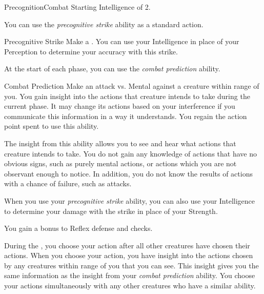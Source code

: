     \begin{feat}{Precognition}{Combat}
        \featpre Starting Intelligence of 2.

         You can use the \textit{precognitive strike} ability as a standard action.
        \begin{freeability}{Precognitive Strike}
            Make a .
            You can use your Intelligence in place of your Perception to determine your accuracy with this strike.
        \end{freeability}

         At the start of each phase, you can use the \textit{combat prediction} ability.
        \begin{apability}{Combat Prediction}
            Make an attack vs. Mental against a creature within \rngmed range of you.
            \hit You gain insight into the actions that creature intends to take during the current phase.
                It may change its actions based on your interference if you communicate this information in a way it understands.
            \miss You regain the action point spent to use this ability.

            The insight from this ability allows you to see and hear what actions that creature intends to take.
            You do not gain any knowledge of actions that have no obvious signs, such as purely mental actions, or actions which you are not observant enough to notice.
            In addition, you do not know the results of actions with a chance of failure, such as attacks.
        \end{apability}

         When you use your \textit{precognitive strike} ability, you can also use your Intelligence to determine your damage with the strike in place of your Strength.

         You gain a  bonus to Reflex defense and  checks.

         During the , you choose your action after all other creatures have chosen their actions.
        When you choose your action, you have insight into the actions chosen by any creatures within \rngclose range of you that you can see.
        This insight gives you the same information as the insight from your \textit{combat prediction} ability.
        You choose your actions simultaneously with any other creatures who have a similar ability.


\end{feat}
